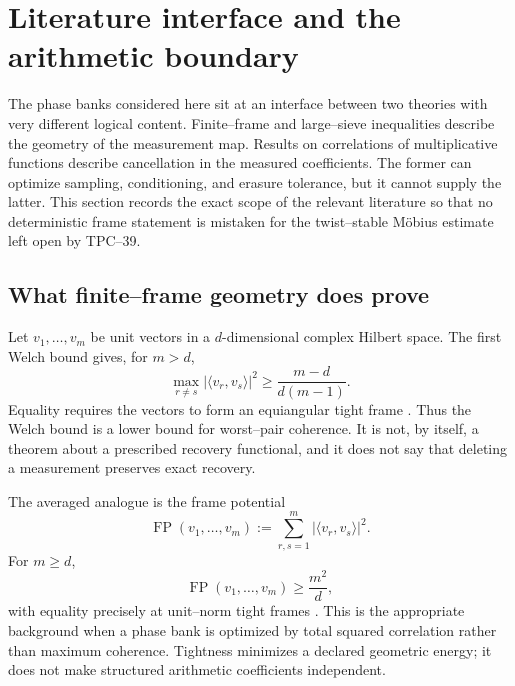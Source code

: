 \section{Literature interface and the arithmetic boundary}
\label{sec:tpc40-literature-boundary}

The phase banks considered here sit at an interface between two theories
with very different logical content.  Finite--frame and large--sieve
inequalities describe the geometry of the measurement map.  Results on
correlations of multiplicative functions describe cancellation in the
measured coefficients.  The former can optimize sampling, conditioning,
and erasure tolerance, but it cannot supply the latter.  This section
records the exact scope of the relevant literature so that no deterministic
frame statement is mistaken for the twist--stable M\"obius estimate left
open by TPC--39.

\subsection{What finite--frame geometry does prove}

Let \(v_1,\ldots,v_m\) be unit vectors in a \(d\)-dimensional complex
Hilbert space.  The first Welch bound gives, for \(m>d\),
\begin{equation}
 \max_{r\ne s}|\langle v_r,v_s\rangle|^2
 \ge \frac{m-d}{d(m-1)}.
 \label{eq:tpc40-Welch-bound}
\end{equation}
Equality requires the vectors to form an equiangular tight frame
\citep{Welch1974}.  Thus the Welch bound is a lower bound for worst--pair
coherence.  It is not, by itself, a theorem about a prescribed recovery
functional, and it does not say that deleting a measurement preserves
exact recovery.

The averaged analogue is the frame potential
\begin{equation}
 \operatorname{FP}(v_1,\ldots,v_m)
 :=\sum_{r,s=1}^{m}|\langle v_r,v_s\rangle|^2.
 \label{eq:tpc40-frame-potential}
\end{equation}
For \(m\ge d\),
\begin{equation}
 \operatorname{FP}(v_1,\ldots,v_m)\ge \frac{m^2}{d},
 \label{eq:tpc40-frame-potential-bound}
\end{equation}
with equality precisely at unit--norm tight frames
\citep{BenedettoFickus2003}.  This is the appropriate background when a
phase bank is optimized by total squared correlation rather than maximum
coherence.  Tightness minimizes a declared geometric energy; it does not
make structured arithmetic coefficients independent.


